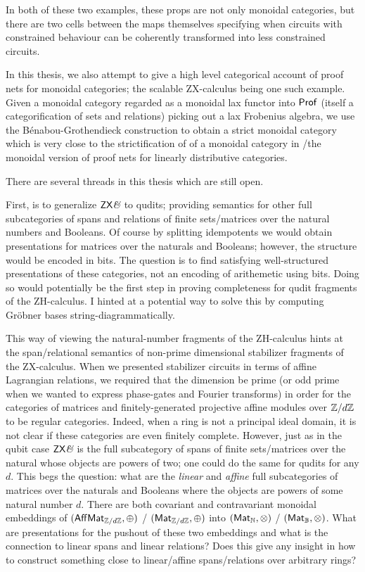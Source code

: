 \documentclass[12pt]{ociamthesis}  %
\begin{document}
In both of these two examples, these props are not only monoidal categories, but there are two cells between the maps themselves specifying when circuits with constrained behaviour can be coherently transformed into less constrained circuits.

In this thesis, we also attempt to give a high level categorical account of proof nets for monoidal categories; the scalable ZX-calculus being one such example.  Given a monoidal category regarded as a monoidal lax functor into ${\sf Prof}$ (itself a categorification of sets and relations) picking out a lax Frobenius algebra, we use the B\'enabou-Grothendieck construction to obtain a strict monoidal category which is very close to the strictification of of a monoidal category in \cite{wilson}/the monoidal version of proof nets for linearly distributive categories.

There are several threads in this thesis which are still open.

First, is to generalize $\mathsf{ZX}\textit{\&}$ to qudits; providing semantics for other full subcategories of spans and relations of finite sets/matrices over the natural numbers and Booleans.  Of course by splitting idempotents we would obtain presentations for matrices over the naturals and Booleans; however, the structure would be encoded in bits.  The question is to find satisfying well-structured presentations of these categories, not an encoding of arithemetic using bits.  Doing so would potentially be the first step in proving completeness for qudit fragments of the ZH-calculus.  I hinted at a potential way to solve this by computing Gr\"obner bases string-diagrammatically.  

This way of viewing the natural-number fragments of the ZH-calculus hints at the span/relational semantics of non-prime dimensional stabilizer fragments of the  ZX-calculus.  When we presented stabilizer circuits in terms of affine Lagrangian relations, we required that the dimension be prime (or odd prime when we wanted to express phase-gates and Fourier transforms) in order for the categories of matrices and finitely-generated projective affine modules over $\mathbb{Z}/d\mathbb{Z}$ to be regular categories.  Indeed,  when a ring is not a principal ideal domain, it is not clear if these categories are even finitely complete.  However, just as in the qubit case $\mathsf{ZX}\textit{\&}$ is the full subcategory of spans of finite sets/matrices over the natural whose objects are powers of two; one could do the same for qudits for any $d$.  This begs the question: what are the {\em linear} and {\em affine} full subcategories of matrices over the naturals and Booleans where the objects are powers of some natural number $d$.  There are both covariant and contravariant monoidal embeddings of $(\mathsf{Aff}\mathsf{Mat}_{\mathbb{Z}/d\mathbb{Z}},\oplus)$ / $(\mathsf{Mat}_{\mathbb{Z}/d\mathbb{Z}},\oplus)$ into $(\mathsf{Mat}_{\mathbb{N}},\otimes)$ / $(\mathsf{Mat}_{\mathbb{B}},\otimes)$.  What are presentations for the pushout of these two embeddings and what is the connection to linear spans and linear relations?  Does this give any insight in how to construct something close to linear/affine spans/relations over arbitrary rings?
\end{document}
